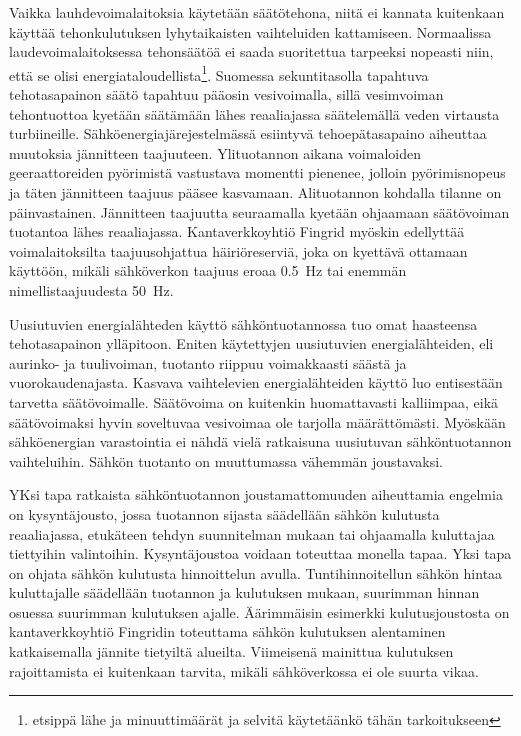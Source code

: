   Vaikka lauhdevoimalaitoksia käytetään säätötehona, niitä ei kannata kuitenkaan käyttää tehonkulutuksen lyhytaikaisten vaihteluiden kattamiseen. Normaalissa laudevoimalaitoksessa tehonsäätöä ei saada suoritettua tarpeeksi nopeasti niin, että se olisi energiataloudellista\footnote{etsippä lähe ja minuuttimäärät ja selvitä käytetäänkö tähän tarkoitukseen}. Suomessa sekuntitasolla tapahtuva tehotasapainon säätö tapahtuu pääosin vesivoimalla, sillä vesimvoiman tehontuottoa kyetään säätämään lähes reaaliajassa säätelemällä veden virtausta turbiineille. Sähköenergiajärejestelmässä esiintyvä tehoepätasapaino aiheuttaa muutoksia jännitteen taajuuteen. Ylituotannon aikana voimaloiden geeraattoreiden pyörimistä vastustava momentti pienenee, jolloin pyörimisnopeus ja täten jännitteen taajuus pääsee kasvamaan. Alituotannon kohdalla tilanne on päinvastainen. Jännitteen taajuutta seuraamalla kyetään ohjaamaan säätövoiman tuotantoa lähes reaaliajassa. Kantaverkkoyhtiö Fingrid myöskin edellyttää voimalaitoksilta taajuusohjattua häiriöreserviä, joka on kyettävä ottamaan käyttöön, mikäli sähköverkon taajuus eroaa \SI{0.5}{\hertz} tai enemmän nimellistaajuudesta \SI{50}{\hertz}.

  Uusiutuvien energialähteden käyttö sähköntuotannossa tuo omat haasteensa tehotasapainon ylläpitoon. Eniten käytettyjen uusiutuvien energialähteiden, eli aurinko- ja tuulivoiman, tuotanto riippuu voimakkaasti säästä ja vuorokaudenajasta. Kasvava vaihtelevien energialähteiden käyttö luo entisestään tarvetta säätövoimalle. Säätövoima on kuitenkin huomattavasti kalliimpaa, eikä säätövoimaksi hyvin soveltuvaa vesivoimaa ole tarjolla määrättömästi. Myöskään sähköenergian varastointia ei nähdä vielä ratkaisuna uusiutuvan sähköntuotannon vaihteluihin.  Sähkön tuotanto on muuttumassa vähemmän joustavaksi. 

  YKsi tapa ratkaista sähköntuotannon joustamattomuuden aiheuttamia engelmia on kysyntäjousto, jossa tuotannon sijasta säädellään sähkön kulutusta reaaliajassa, etukäteen tehdyn suunnitelman mukaan tai ohjaamalla kuluttajaa tiettyihin valintoihin. Kysyntäjoustoa voidaan toteuttaa monella tapaa. Yksi tapa on ohjata sähkön kulutusta hinnoittelun avulla. Tuntihinnoitellun sähkön hintaa kuluttajalle säädellään tuotannon ja kulutuksen mukaan, suurimman hinnan osuessa suurimman kulutuksen ajalle. Äärimmäisin esimerkki kulutusjoustosta on kantaverkkoyhtiö Fingridin toteuttama sähkön kulutuksen alentaminen katkaisemalla jännite tietyiltä alueilta. Viimeisenä mainittua kulutuksen rajoittamista ei kuitenkaan tarvita, mikäli sähköverkossa ei ole suurta vikaa.

